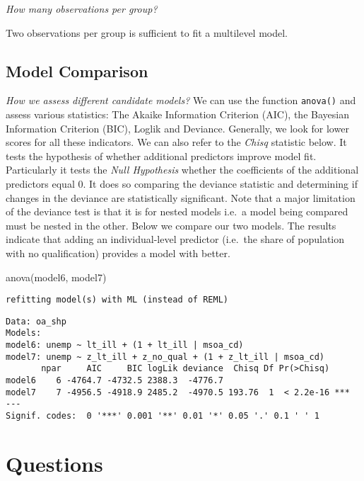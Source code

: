 \documentclass[
  letterpaper,
  krantz2]{style/krantz}
\newenvironment{Shaded}{\begin{snugshade}}{\end{snugshade}}
\newcommand{\FunctionTok}[1]{\textcolor[rgb]{0.28,0.35,0.67}{#1}}
\newcommand{\NormalTok}[1]{\textcolor[rgb]{0.00,0.23,0.31}{#1}}
\begin{document}
\emph{How many observations per group?}

Two observations per group is sufficient to fit a multilevel model.

\hypertarget{model-comparison}{%
\subsection{Model Comparison}\label{model-comparison}}

\emph{How we assess different candidate models?} We can use the function
\texttt{anova()} and assess various statistics: The Akaike Information
Criterion (AIC), the Bayesian Information Criterion (BIC), Loglik and
Deviance. Generally, we look for lower scores for all these indicators.
We can also refer to the \emph{Chisq} statistic below. It tests the
hypothesis of whether additional predictors improve model fit.
Particularly it tests the \emph{Null Hypothesis} whether the
coefficients of the additional predictors equal 0. It does so comparing
the deviance statistic and determining if changes in the deviance are
statistically significant. Note that a major limitation of the deviance
test is that it is for nested models i.e.~a model being compared must be
nested in the other. Below we compare our two models. The results
indicate that adding an individual-level predictor (i.e.~the share of
population with no qualification) provides a model with better.

\begin{Shaded}
\begin{Highlighting}[]
\FunctionTok{anova}\NormalTok{(model6, model7)}
\end{Highlighting}
\end{Shaded}

\begin{verbatim}
refitting model(s) with ML (instead of REML)
\end{verbatim}

\begin{verbatim}
Data: oa_shp
Models:
model6: unemp ~ lt_ill + (1 + lt_ill | msoa_cd)
model7: unemp ~ z_lt_ill + z_no_qual + (1 + z_lt_ill | msoa_cd)
       npar     AIC     BIC logLik deviance  Chisq Df Pr(>Chisq)    
model6    6 -4764.7 -4732.5 2388.3  -4776.7                         
model7    7 -4956.5 -4918.9 2485.2  -4970.5 193.76  1  < 2.2e-16 ***
---
Signif. codes:  0 '***' 0.001 '**' 0.01 '*' 0.05 '.' 0.1 ' ' 1
\end{verbatim}

\hypertarget{questions-4}{%
\section{Questions}\label{questions-4}}
\end{document}
